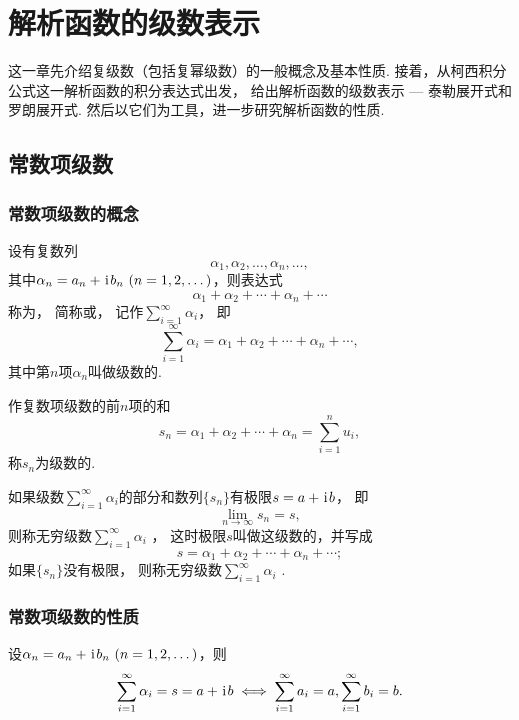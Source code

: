 \chapter{解析函数的级数表示}
这一章先介绍复级数（包括复幂级数）的一般概念及基本性质.
接着，从柯西积分公式这一解析函数的积分表达式出发，
给出解析函数的级数表示 --- 泰勒展开式和罗朗展开式.
然后以它们为工具，进一步研究解析函数的性质.

\section{常数项级数}
\subsection{常数项级数的概念}
\begin{definition}
设有复数列\[
\alpha_1,\alpha_2,\dotsc,\alpha_n,\dotsc,
\]其中\(\alpha_n=a_n+\iu b_n\ (n=1,2,\dotsc)\)，则表达式\[
\alpha_1+\alpha_2+\dotsb+\alpha_n+\dotsb
\]称为，
简称或，
记作\(\sum_{i=1}^\infty \alpha_i\)，
即\[
\sum_{i=1}^\infty \alpha_i = \alpha_1+\alpha_2+\dotsb+\alpha_n+\dotsb,
\]其中第\(n\)项\(\alpha_n\)叫做级数的.

作复数项级数的前\(n\)项的和\[
s_n = \alpha_1+\alpha_2+\dotsb+\alpha_n = \sum_{i=1}^n{u_i},
\]称\(s_n\)为级数的.

如果级数\(\sum_{i=1}^\infty \alpha_i\)的部分和数列\(\{s_n\}\)有极限\(s=a+\kern1pt\mathrm{i}\kern1pt b\)，
即\[
\lim_{n\to\infty}s_n = s,
\]
则称无穷级数\(\sum_{i=1}^\infty \alpha_i\) ，
这时极限\(s\)叫做这级数的，并写成\[
s = \alpha_1+\alpha_2+\dotsb+\alpha_n+\dotsb;
\]
如果\(\{s_n\}\)没有极限，
则称无穷级数\(\sum_{i=1}^\infty \alpha_i\) .
\end{definition}

\subsection{常数项级数的性质}
\begin{theorem}\label{theorem:解析函数的级数表示.复级数与其实部及虚部级数的关系}
设\(\alpha_n=a_n+\iu b_n\ (n=1,2,\dots)\)，则\[
\sum_{i=1}^\infty \alpha_i = s = a + \kern1pt\mathrm{i}\kern1pt b
\iff
\sum_{i=1}^\infty a_i = a,
\sum_{i=1}^\infty b_i = b.
\]
\end{theorem}

